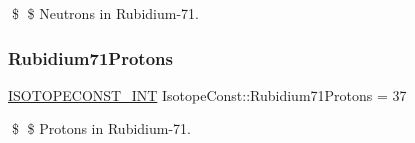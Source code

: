 \$ \$ Neutrons in Rubidium-\/71. \mbox{\label{group___isotope_const-_rubidium-_rb71_ga3eeb91cfdcb00b7f84ed44101b7c326a}} 
\subsubsection{\texorpdfstring{Rubidium71\+Protons}{Rubidium71Protons}}
{\footnotesize\ttfamily \mbox{\hyperlink{group___isotope_const-_macros_ga5f18360b3e99483a35c32d789e62621c}{I\+S\+O\+T\+O\+P\+E\+C\+O\+N\+S\+T\+\_\+\+I\+NT}} Isotope\+Const\+::\+Rubidium71\+Protons = 37}

\$ \$ Protons in Rubidium-\/71. 